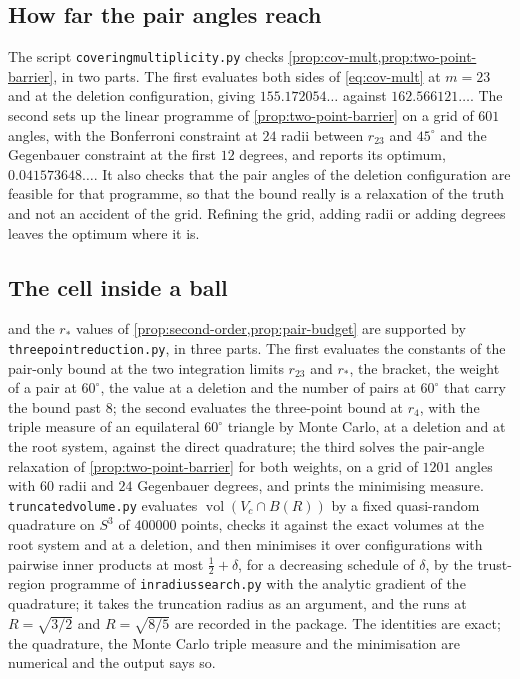 \documentclass[11pt,reqno]{amsart}
\renewcommand{\_}{\origunderscore\allowbreak}
\numberwithin{equation}{section}
\theoremstyle{plain}
\theoremstyle{definition}
\theoremstyle{remark}
\DeclareMathOperator{\vol}{vol}
\begin{document}
\subsection*{How far the pair angles reach}

The script \texttt{covering\_multiplicity.py} checks
\cref{prop:cov-mult,prop:two-point-barrier}, in two parts. The first
evaluates
both sides of \eqref{eq:cov-mult} at $m=23$ and at the deletion
configuration, giving $155.172054\ldots$ against $162.566121\ldots$. The
second sets up the linear programme of \cref{prop:two-point-barrier} on a
grid of $601$ angles, with the Bonferroni constraint at $24$ radii
between $r_{23}$ and $45^\circ$ and the Gegenbauer constraint at the
first $12$ degrees, and reports its optimum, $0.041573648\ldots$. It also
checks that the pair angles of the deletion configuration are feasible
for that programme, so that the bound really is a relaxation of the
truth and not an accident of the grid. Refining the grid, adding radii or
adding degrees leaves the optimum where it is.

\subsection*{The cell inside a ball}

 and
the $r_*$ values of \cref{prop:second-order,prop:pair-budget} are
supported by \texttt{three\_point\_reduction.py}, in three parts.
The first evaluates the constants of the pair-only bound at the two
integration limits $r_{23}$ and $r_*$, the bracket, the weight of a
pair at $60^\circ$, the value at a deletion and the number of pairs at
$60^\circ$ that carry the bound past $8$; the second evaluates the
three-point bound at $r_4$, with the triple measure of an equilateral
$60^\circ$ triangle by Monte Carlo, at a deletion and at the root
system, against the direct quadrature; the third solves the pair-angle
relaxation of \cref{prop:two-point-barrier} for both weights, on a
grid of $1201$ angles with $60$ radii and $24$ Gegenbauer degrees, and
prints the minimising measure. \texttt{truncated\_volume.py} evaluates
$\vol(V_c\cap B(R))$ by a fixed quasi-random quadrature on $S^3$ of
$400000$ points, checks it against the exact volumes at the root system
and at a deletion, and then minimises it over configurations with
pairwise inner products at most $\tfrac12+\delta$, for a decreasing
schedule of $\delta$, by the trust-region programme of
\texttt{inradius\_search.py} with the analytic gradient of the
quadrature; it takes the truncation radius as an argument, and the
runs at $R=\sqrt{3/2}$ and $R=\sqrt{8/5}$ are recorded in the package.
The identities are exact; the quadrature, the Monte Carlo triple
measure and the minimisation are numerical and the output says so.
\end{document}
